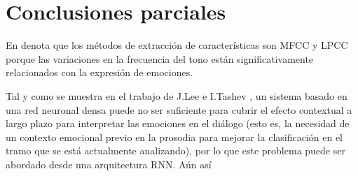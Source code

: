 \documentclass[11pt,a4paper,spanish]{book}
\begin{document}
	\section{Conclusiones parciales}
	En \cite{Langari2020} denota que los métodos de extracción de características son MFCC y LPCC porque las variaciones en la frecuencia del tono están significativamente relacionados con la expresión de emociones.
	
	Tal y como se muestra en el trabajo de J.Lee e I.Tashev \cite{Lee2015}, un sistema basado en una red neuronal densa puede no ser suficiente para cubrir el efecto contextual a largo plazo para interpretar las emociones en el diálogo (esto es, la necesidad de un contexto emocional previo en la prosodia para mejorar la clasificación en el tramo que se está actualmente analizando), por lo que este problema puede ser abordado desde una arquitectura RNN. Aún así
	

	
	
	
		
	
	\printbibliography
\end{document}
